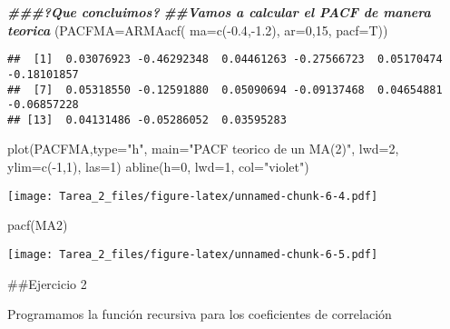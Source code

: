 \documentclass[
]{article}
\newenvironment{Shaded}{\begin{snugshade}}{\end{snugshade}}
\newcommand{\AttributeTok}[1]{\textcolor[rgb]{0.77,0.63,0.00}{#1}}
\newcommand{\DecValTok}[1]{\textcolor[rgb]{0.00,0.00,0.81}{#1}}
\newcommand{\DocumentationTok}[1]{\textcolor[rgb]{0.56,0.35,0.01}{\textbf{\textit{#1}}}}
\newcommand{\FloatTok}[1]{\textcolor[rgb]{0.00,0.00,0.81}{#1}}
\newcommand{\FunctionTok}[1]{\textcolor[rgb]{0.00,0.00,0.00}{#1}}
\newcommand{\NormalTok}[1]{#1}
\newcommand{\SpecialCharTok}[1]{\textcolor[rgb]{0.00,0.00,0.00}{#1}}
\newcommand{\StringTok}[1]{\textcolor[rgb]{0.31,0.60,0.02}{#1}}
\begin{document}
\begin{Shaded}
\begin{Highlighting}[]
\DocumentationTok{\#\#\#?Que concluimos?}
\DocumentationTok{\#\#Vamos a calcular el PACF de manera teorica }
\NormalTok{(}\AttributeTok{PACFMA=}\FunctionTok{ARMAacf}\NormalTok{( }\AttributeTok{ma=}\FunctionTok{c}\NormalTok{(}\SpecialCharTok{{-}}\FloatTok{0.4}\NormalTok{,}\SpecialCharTok{{-}}\FloatTok{1.2}\NormalTok{), }\AttributeTok{ar=}\DecValTok{0}\NormalTok{,}\DecValTok{15}\NormalTok{, }\AttributeTok{pacf=}\NormalTok{T))}
\end{Highlighting}
\end{Shaded}

\begin{verbatim}
##  [1]  0.03076923 -0.46292348  0.04461263 -0.27566723  0.05170474 -0.18101857
##  [7]  0.05318550 -0.12591880  0.05090694 -0.09137468  0.04654881 -0.06857228
## [13]  0.04131486 -0.05286052  0.03595283
\end{verbatim}

\begin{Shaded}
\begin{Highlighting}[]
\FunctionTok{plot}\NormalTok{(PACFMA,}\AttributeTok{type=}\StringTok{"h"}\NormalTok{, }\AttributeTok{main=}\StringTok{"PACF teorico de un MA(2)"}\NormalTok{, }\AttributeTok{lwd=}\DecValTok{2}\NormalTok{, }\AttributeTok{ylim=}\FunctionTok{c}\NormalTok{(}\SpecialCharTok{{-}}\DecValTok{1}\NormalTok{,}\DecValTok{1}\NormalTok{), }\AttributeTok{las=}\DecValTok{1}\NormalTok{)}
\FunctionTok{abline}\NormalTok{(}\AttributeTok{h=}\DecValTok{0}\NormalTok{, }\AttributeTok{lwd=}\DecValTok{1}\NormalTok{, }\AttributeTok{col=}\StringTok{"violet"}\NormalTok{)}
\end{Highlighting}
\end{Shaded}

\texttt{[image: Tarea\_2\_files/figure-latex/unnamed-chunk-6-4.pdf]}

\begin{Shaded}
\begin{Highlighting}[]
\FunctionTok{pacf}\NormalTok{(MA2)}
\end{Highlighting}
\end{Shaded}

\texttt{[image: Tarea\_2\_files/figure-latex/unnamed-chunk-6-5.pdf]}

\#\#Ejercicio 2

Programamos la función recursiva para los coeficientes de correlación
\end{document}
